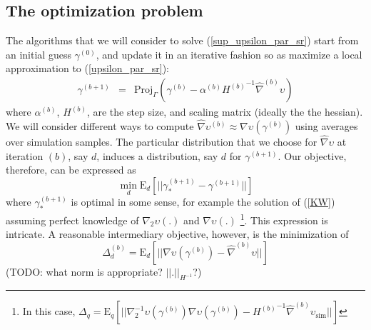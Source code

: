\documentclass{article}
\begin{document}
\subsection{The optimization problem}
The algorithms that we will consider to solve
(\ref{sup_upsilon_par_sr}) start from an initial guess
$\gamma^{(0)}$, and update it in an iterative fashion so as maximize
a local approximation to (\ref{upsilon_par_sr}):
\begin{eqnarray}\label{KW}
\gamma^{(b+1)}&=&\mathrm{Proj}_{\Gamma}(\gamma^{(b)}-\alpha^{(b)}
{H^{(b)}}^{-1}\widehat{\nabla}^{(b)} \upsilon)
\end{eqnarray}where
$\alpha^{(b)}$, $H^{(b)}$, are the step size, and scaling matrix
(ideally the the hessian). We will consider different ways to
compute $\widehat{\nabla} \upsilon^{(b)} \approx \nabla
\upsilon(\gamma^{(b)})$ using averages over simulation samples. The
particular distribution that we choose for $\widehat{\nabla}
\upsilon$ at iteration $(b)$, say $d$, induces a distribution, say
$d$ for $\gamma^{(b+1)}$. Our objective, therefore, can be expressed
as
\begin{equation}
\min_d \mathrm{E}_d[||\gamma_*^{(b+1)}-\gamma^{(b+1)}||]
\end{equation}where $\gamma_*^{(b+1)}$ is optimal in some sense, for
example the solution of (\ref{KW}) assuming perfect knowledge of
$\nabla_2 \upsilon(.)$ and $\nabla \upsilon(.)$ \footnote{In this
case, $\Delta_q=\mathrm{E}_q[||\nabla_2^{-1}
\upsilon(\gamma^{(b)})\nabla
\upsilon(\gamma^{(b)})-{H^{(b)}}^{-1}\widehat\nabla^{(b)}\upsilon_{\mathrm{sim}}||]$}.
This expression is intricate. A reasonable intermediary objective,
however, is the minimization of
\begin{equation}\label{gradient_distance}
\Delta_d^{(b)} = \mathrm{E}_d[||\nabla
\upsilon(\gamma^{(b)})-\widehat\nabla^{(b)} \upsilon||]
\end{equation}(TODO: what norm is appropriate? $||.||_{H^{-1}}$?)
\end{document}
